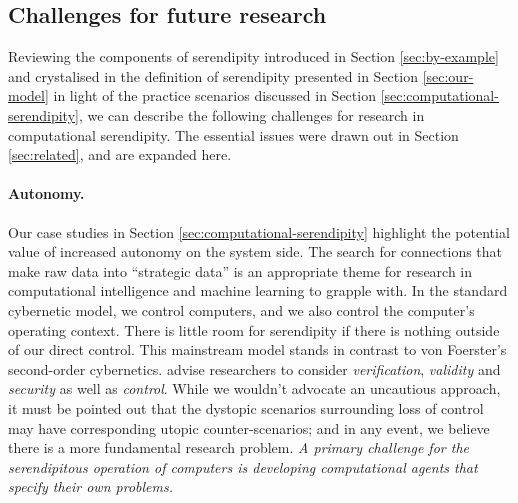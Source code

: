 

\subsection{Challenges for future research} \label{sec:recommendations}

Reviewing the components of serendipity introduced in Section
\ref{sec:by-example} and crystalised in the definition of serendipity
presented in Section \ref{sec:our-model} in light of the practice
scenarios discussed in Section \ref{sec:computational-serendipity}, we
can describe the following challenges for research in computational
serendipity.  The essential issues were drawn out in Section \ref{sec:related}, and are expanded here.

\paragraph{\textbf{Autonomy}.} Our case studies in Section
  \ref{sec:computational-serendipity} highlight the potential value of
  increased autonomy on the system side.  The search for connections
  that make raw data into ``strategic data'' is an appropriate theme
  for research in computational intelligence and machine learning to
  grapple with.  In the standard cybernetic model, we control
  computers, and we also control the computer's operating context.
  There is little room for serendipity if there is nothing outside of
  our direct control.  This mainstream model stands in contrast to von
  Foerster's \citeyear{von2003cybernetics} second-order
  cybernetics.   advise researchers to
  consider \emph{verification}, \emph{validity} and \emph{security} as
  well as \emph{control}.  While we wouldn't advocate an uncautious
  approach, it must be pointed out that the dystopic scenarios
  surrounding loss of control may have corresponding utopic
  counter-scenarios; and in any event, we believe there is a more
  fundamental research problem.  \emph{A primary challenge for
    the serendipitous operation of computers is developing
    computational agents that specify their own problems.}

